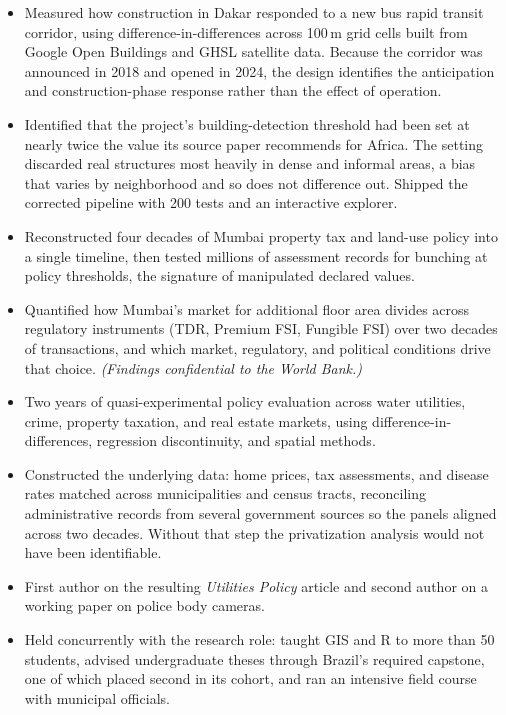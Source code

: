 \begin{itemize}
  \item Measured how construction in Dakar responded to a new bus rapid transit corridor, using difference-in-differences across 100\,m grid cells built from Google Open Buildings and GHSL satellite data. Because the corridor was announced in 2018 and opened in 2024, the design identifies the anticipation and construction-phase response rather than the effect of operation.
  \item Identified that the project's building-detection threshold had been set at nearly twice the value its source paper recommends for Africa. The setting discarded real structures most heavily in dense and informal areas, a bias that varies by neighborhood and so does not difference out. Shipped the corrected pipeline with 200 tests and an interactive explorer.
  \item Reconstructed four decades of Mumbai property tax and land-use policy into a single timeline, then tested millions of assessment records for bunching at policy thresholds, the signature of manipulated declared values.
  \item Quantified how Mumbai's market for additional floor area divides across regulatory instruments (TDR, Premium FSI, Fungible FSI) over two decades of transactions, and which market, regulatory, and political conditions drive that choice. \textit{(Findings confidential to the World Bank.)}
\end{itemize}

\vspace{1.5pt}

\begin{itemize}
  \item Two years of quasi-experimental policy evaluation across water utilities, crime, property taxation, and real estate markets, using difference-in-differences, regression discontinuity, and spatial methods.
  \item Constructed the underlying data: home prices, tax assessments, and disease rates matched across municipalities and census tracts, reconciling administrative records from several government sources so the panels aligned across two decades. Without that step the privatization analysis would not have been identifiable.
  \item First author on the resulting \textit{Utilities Policy} article and second author on a working paper on police body cameras.
  \item Held concurrently with the research role: taught GIS and R to more than 50 students, advised undergraduate theses through Brazil's required capstone, one of which placed second in its cohort, and ran an intensive field course with municipal officials.
\end{itemize}


